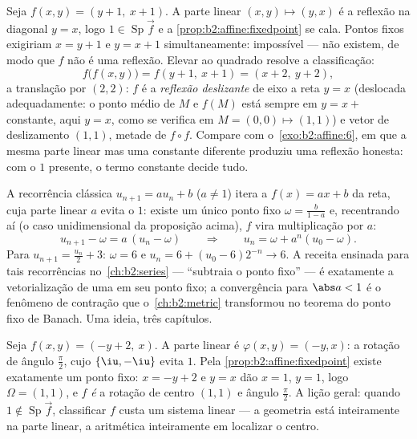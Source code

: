 \begin{example}\label{ex:b2:affine:glide}
Seja $f(x, y) = (y + 1,\ x + 1)$. A parte linear $(x, y)
\mapsto (y, x)$ é a reflexão na diagonal $y = x$, logo
$1 \in \operatorname{Sp}\vec f$ e a
\cref{prop:b2:affine:fixedpoint} se cala. Pontos fixos
exigiriam $x = y + 1$ e $y = x + 1$ simultaneamente:
impossível --- não existem, de modo que $f$ não é uma reflexão. Elevar ao quadrado
resolve a classificação:
\[
f\bigl(f(x, y)\bigr) = f(y + 1,\ x + 1) = (x + 2,\ y + 2),
\]
a translação por $(2, 2)$: $f$ é a \emph{reflexão
deslizante} de eixo a reta $y = x$ (deslocada
adequadamente: o ponto médio de $M$ e $f(M)$ está sempre em
$y = x + {}$constante, aqui $y = x$, como se verifica em $M = (0,
0) \mapsto (1,1)$) e vetor de deslizamento $(1, 1)$, metade de $f
\circ f$. Compare com o~\cref{exo:b2:affine:6}, em que a mesma
parte linear mas uma constante diferente produziu uma reflexão
honesta: com o  $1$ presente, o termo constante
decide tudo.
\end{example}

\begin{example}\label{ex:b2:affine:recursion}
A recorrência clássica $u_{n+1} = au_n + b$ ($a \neq 1$)
itera a  $f(x) = ax + b$ da reta, cuja
parte linear $a$ evita o  $1$: existe um único
ponto fixo $\omega = \frac{b}{1-a}$ e, recentrando aí
(o caso unidimensional da proposição acima), $f$ vira multiplicação por $a$:
\[
u_{n+1} - \omega = a\,(u_n - \omega)
\qquad\Longrightarrow\qquad
u_n = \omega + a^n(u_0 - \omega) .
\]
Para $u_{n+1} = \frac{u_n}2 + 3$: $\omega = 6$ e $u_n = 6 +
(u_0 - 6)2^{-n} \to 6$. A receita ensinada para tais
recorrências no~\cref{ch:b2:series} --- ``subtraia o ponto
fixo'' --- é exatamente a vetorialização de uma 
em seu ponto fixo; a convergência para $\abs a < 1$ é o fenômeno de
contração que o~\cref{ch:b2:metric} transformou no
teorema do ponto fixo de Banach. Uma ideia, três capítulos.
\end{example}

\begin{example}\label{ex:b2:affine:rotationcenter}
Seja $f(x, y) = (-y + 2,\ x)$. A parte linear é
$\varphi(x, y) = (-y, x)$: a rotação de ângulo $\frac\pi2$,
cujo  $\{\iu, -\iu\}$ evita $1$. Pela
\cref{prop:b2:affine:fixedpoint} existe exatamente um ponto
fixo: $x = -y + 2$ e $y = x$ dão $x = 1$, $y = 1$, logo
$\Omega = (1, 1)$, e $f$ \emph{é} a rotação de centro
$(1, 1)$ e ângulo $\frac\pi2$. A lição geral: quando $1
\notin \operatorname{Sp}\vec f$, classificar $f$ custa um
sistema linear --- a geometria está inteiramente na parte linear,
a aritmética inteiramente em localizar o centro.
\end{example}

